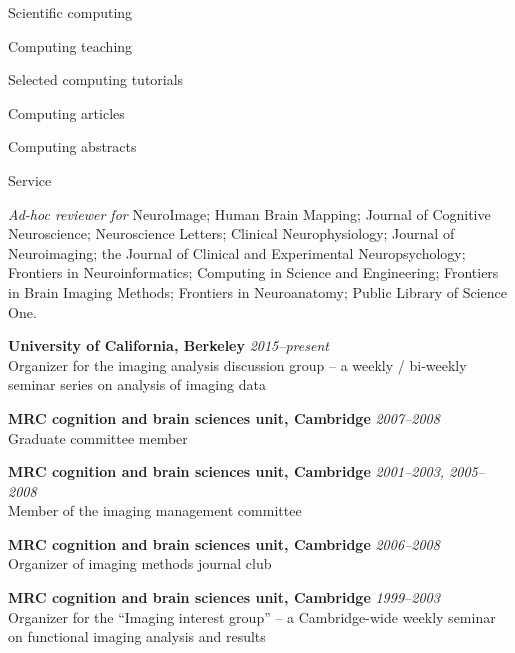 \documentclass{cv}
\newcommand{\PlaceDateNote}[3]{{\bf #1} \hfill {\em #2} \\#3}
\newcommand{\UCB}{University of California, Berkeley}
\newcommand{\CBU}{MRC cognition and brain sciences unit, Cambridge}
\begin{document}
\begin{cvSection}{Scientific computing}
\begin{cvSubSection}{Computing teaching}
\end{cvSubSection}

\begin{cvSubSection}{Selected computing tutorials}

\printbibliography[heading=none,
    keyword=computing,
    keyword=online,
notkeyword=omit]

\end{cvSubSection}

\begin{cvSubSection}{Computing articles}

\printbibliography[heading=none,
    keyword=computing,
    keyword=article,
notkeyword=omit]

\end{cvSubSection}

\begin{cvSubSection}{Computing abstracts}

\printbibliography[heading=none,
    keyword=computing,
    keyword=abstract,
notkeyword=omit]

\end{cvSubSection}

\end{cvSection}

\begin{cvSection}{Service}

    {\em Ad-hoc reviewer for} NeuroImage; Human Brain Mapping; Journal of
    Cognitive Neuroscience; Neuroscience Letters; Clinical Neurophysiology;
    Journal of Neuroimaging; the Journal of Clinical and Experimental
    Neuropsychology; Frontiers in Neuroinformatics; Computing in Science and
    Engineering; Frontiers in Brain Imaging Methods; Frontiers in
    Neuroanatomy; Public Library of Science One.

\PlaceDateNote{\UCB}{2015--present}
{Organizer for the imaging analysis discussion group -- a weekly / bi-weekly
seminar series on analysis of imaging data}

\PlaceDateNote{\CBU}{2007--2008}
{Graduate committee member}

\PlaceDateNote{\CBU}{2001--2003, 2005--2008}
{Member of the imaging management committee}

\PlaceDateNote{\CBU}{2006--2008}
{Organizer of imaging methods journal club}

\PlaceDateNote{\CBU}{1999--2003}
{Organizer for the ``Imaging interest group'' -- a Cambridge-wide weekly
seminar on functional imaging analysis and results}

\end{cvSection}
\end{document}
